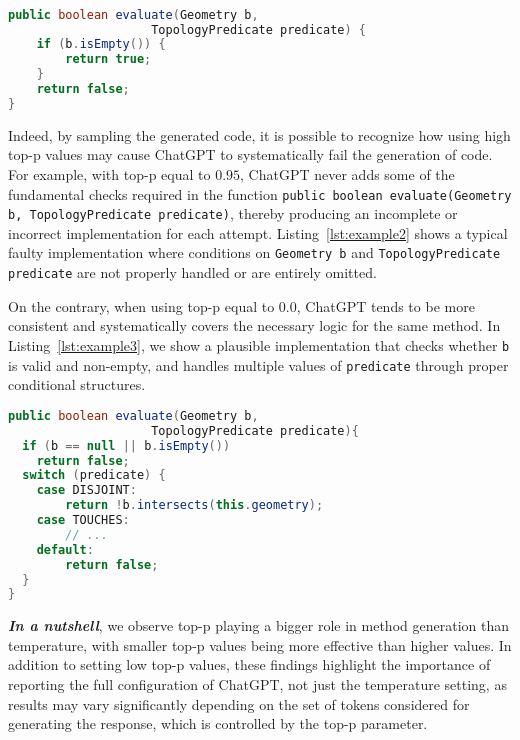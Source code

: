 \begin{lstlisting}[language=Java, xleftmargin=.12in,label=lst:example2,caption= Systematically wrong implementation of the \texttt{evaluate}\\ method with \textit{top-p} 0.95.] 

public boolean evaluate(Geometry b, 
                    TopologyPredicate predicate) {
    if (b.isEmpty()) {
        return true;
    }
    return false;
}
\end{lstlisting}


Indeed, by sampling the generated code, it is possible to recognize how using high top-p values may cause ChatGPT to systematically fail the generation of code. For example, with top-p equal to $0.95$, ChatGPT never 
adds some of the fundamental checks required in the function 
\texttt{\small public boolean evaluate(Geometry b, TopologyPredicate predicate)}, thereby producing an incomplete or incorrect implementation for each attempt. 
Listing~\ref{lst:example2} shows a typical faulty implementation where conditions on \texttt{Geometry b} and \texttt{TopologyPredicate predicate} are not properly handled or are entirely omitted.

On the contrary, when using top-p equal to $0.0$, ChatGPT tends to be more consistent and systematically covers the necessary logic for the same method. In Listing~\ref{lst:example3}, we show a plausible implementation that checks whether \texttt{b} is valid and non-empty, and handles multiple values of \texttt{predicate} through proper conditional structures.

\begin{lstlisting}[language=Java, xleftmargin=.18in, label=lst:example3, caption=Plausible implementation with \textit{top-p} 0.0.]
public boolean evaluate(Geometry b, 
                    TopologyPredicate predicate){
  if (b == null || b.isEmpty()) 
    return false;
  switch (predicate) {
    case DISJOINT: 
        return !b.intersects(this.geometry);
    case TOUCHES:  
        // ...
    default:       
        return false;
  }
}
\end{lstlisting}



\textbf{\textit{In a nutshell}}, we observe top-p playing a bigger role in method generation than temperature, with smaller top-p values being more effective than higher values. %
In addition to setting low top-p values, these findings highlight the importance of reporting the full configuration of ChatGPT, not just the temperature setting, as results may vary significantly depending on the set of tokens considered for generating the response, which is controlled by the top-p parameter.

